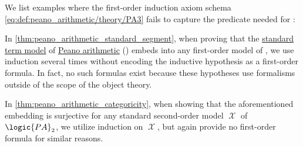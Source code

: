 \begin{example}\label{ex:peano_arithmetic_fol_induction}
  We list examples where the first-order induction axiom schema \eqref{eq:def:peano_arithmetic/theory/PA3} fails to capture the predicate needed for :
  \begin{thmenum}
     In \cref{thm:peano_arithmetic_standard_segment}, when proving that the \hyperref[def:peano_arithmetic_term_model]{standard term model} of \hyperref[def:peano_arithmetic]{Peano arithmetic} () embeds into any first-order model of , we use induction several times without encoding the inductive hypothesis as a first-order formula. In fact, no such formulas exist because these hypotheses use formalisms outside of the scope of the object theory.

     In \cref{thm:peano_arithmetic_categoricity}, when showing that the aforementioned embedding is surjective for any standard second-order model \( \mscrX \) of \( \logic{PA}_2 \), we utilize induction on \( \mscrX \), but again provide no first-order formula for similar reasons.
  \end{thmenum}
\end{example}

